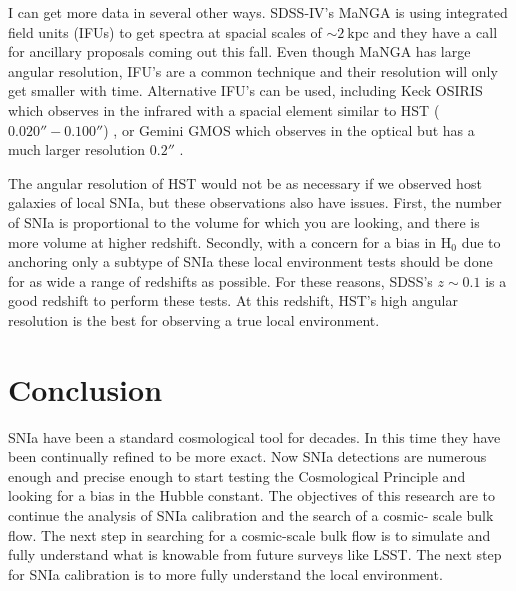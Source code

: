 \documentclass[apj, iop]{emulateapj}
\newcommand{\sn}{SNIa}
\newcommand{\Hubble}{\ensuremath{\text{H}_0}}
\begin{document}
I can get more data in several other ways. SDSS-IV's MaNGA is using integrated
field units (IFUs) to get spectra at spacial scales of $\sim 2 ~\text{kpc}$ and
they have a call for ancillary proposals coming out this fall. Even though MaNGA
has large angular resolution, IFU's are a common technique and their resolution
will only get smaller with time. Alternative IFU's can be used, including Keck
OSIRIS which observes in the infrared with a spacial element similar to HST
($0.020'' - 0.100''$) \citep{OSIRIS},
or Gemini GMOS which observes in the optical but has a much larger resolution
$0.2''$ \citep{Gemini}.

The angular resolution of HST would not be as necessary if we observed host
galaxies of local \sn{}, but these observations also have issues. First, the
number of \sn{} is proportional to the volume for which you are looking, and
there is more volume at higher redshift. Secondly,
with a concern for a bias in \Hubble{} due to anchoring only a subtype of \sn{} 
these local environment tests should be done for
as wide a range of redshifts as possible. For these reasons, SDSS's $z \sim 0.1$
is a good redshift to perform these tests. At this redshift, HST's high angular
resolution is the best for observing a true local environment.

\section{Conclusion}

\sn{} have been a standard cosmological tool for decades. In this time they
have been continually refined to be more exact. Now \sn{} detections are
numerous enough and precise enough to start testing the Cosmological Principle
and looking for a bias in the Hubble constant.  The objectives of this research
are to continue the analysis of \sn{} calibration and the search of a cosmic-
scale bulk flow. The next step in searching for a cosmic-scale bulk flow is to
simulate and fully understand what is knowable from future surveys like LSST.
The next step for \sn{} calibration is to more fully understand the local
environment.



\end{document}

